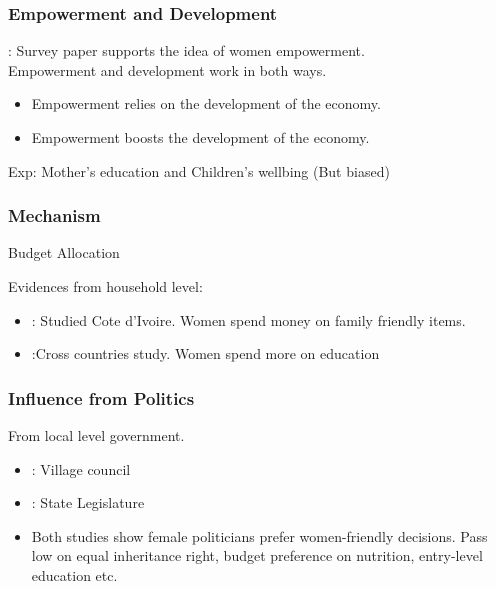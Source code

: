\documentclass[12pt]{beamer}
\begin{document}
\begin{frame}
	\frametitle{Empowerment and Development}

	: Survey paper supports the idea of women empowerment.\\\pause
	Empowerment and development work in both ways.\pause
	
	\begin{itemize}
		\item Empowerment relies on the development of the economy.
		\item Empowerment boosts the development of the economy. 
	\end{itemize}
\alert{Exp:} Mother's education and Children's wellbing (But biased)
\end{frame}

\begin{frame}
	\frametitle{Mechanism}
	\begin{center}
	\alert{Budget Allocation}\pause
	\end{center}
Evidences from household level:\\
\begin{itemize}
	\item {}: Studied Cote d'Ivoire. Women spend money on \alert{family friendly} items.\\
	\item {}:Cross countries study. Women spend more on \alert{education}\\
\end{itemize}
\end{frame}


\begin{frame}
	\frametitle{Influence from Politics}
\begin{center}
	From local level government.\pause
\end{center}
	\begin{itemize}
		\item {}: Village council
		\item {}: State Legislature
		\item Both studies show female politicians prefer \alert{women-friendly} decisions. Pass low on equal inheritance right, budget preference on nutrition, entry-level education etc.
	\end{itemize}
\end{frame}
\end{document}

